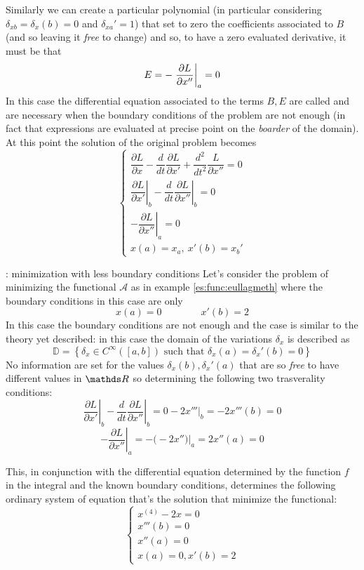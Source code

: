 Similarly we can create a particular polynomial (in particular considering $ \delta_{xb} = \delta_x(b) = 0$ and $\delta_{xa}' = 1$) that set to zero the coefficients associated to $B$ (and so leaving it \textit{free} to change) and so, to have a zero evaluated derivative, it must be that
\[ E = - \left. \frac{\partial L }{\partial x''} \right|_a = 0 \] 
In this case the differential equation associated to the terms $B,E$ are called  and are necessary when the boundary conditions of the problem are not enough (in fact that expressions are evaluated at precise point on the \textit{boarder} of the domain). At this point the solution of the original problem becomes
\[ \begin{cases}
	\dfrac{\partial L }{\partial x} - \dfrac{d}{dt} \dfrac{\partial L }{\partial x'} + \dfrac{d^2}{dt^2} \dfrac{L }{\partial x''} = 0 \\
	\left.\dfrac{\partial L }{\partial x'} \right|_b - \left. \dfrac{d}{dt} \dfrac{\partial L }{\partial x''} \right|_b = 0\\
	-\left. \dfrac{\partial L }{\partial x''} \right|_a = 0 \\
	x(a) = x_a, \ x'(b) = x_b'
\end{cases} \]

\begin{example}{: minimization with less boundary conditions}
	Let's consider the problem of minimizing the functional $\mathcal A$ as in example \ref{es:func:eullagmeth} where the boundary conditions in this case are only
	\[ x(a) = 0 \qquad \qquad x'(b) = 2  \]
	In this case the boundary conditions are not enough and the case is similar to the theory yet described: in this case the domain of the variations $\delta_x$ is described as
	\[ \mathds D = \left\{ \delta_x\in C^\infty([a,b]) \textrm{ such that } \delta_x(a) =\delta_x'(b) = 0 \right\} \]
	No information are set for the values $\delta_x(b), \delta_x'(a)$ that are so \textit{free} to have different values in $\R$ so determining the following two trasverality conditions:
	\[ \left.\dfrac{\partial L }{\partial x'} \right|_b - \left. \dfrac{d}{dt} \dfrac{\partial L }{\partial x''} \right|_b = 0-2x'''\Big|_b = -2x'''(b) = 0 \]\[ -\left. \dfrac{\partial L }{\partial x''} \right|_a = - \big(-2x''\big)\Big|_a = 2x''(a) = 0   \]
	
	This, in conjunction with the differential equation determined by the function $f$ in the integral and the known boundary conditions, determines the following ordinary system of equation that's the solution that minimize the functional:
	\[ \begin{cases}
		x^{(4)} - 2x = 0 \\
		x'''(b) = 0 \\ x''(a) = 0 \\
		x(a) = 0, x'(b) = 2
	\end{cases} \]		
\end{example}

